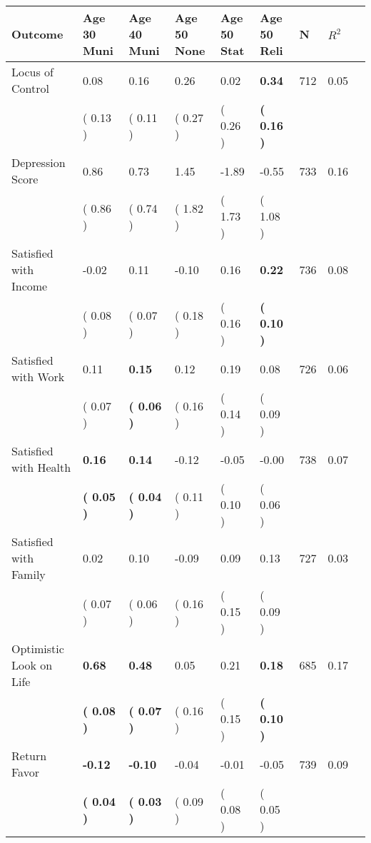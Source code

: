 \begin{tabular}{L{6.2cm} C{1.8cm} C{1.8cm} C{1.8cm} C{1.8cm} C{1.8cm} C{1.8cm} C{0.3cm} C{0.3cm}}
\toprule
 \textbf{Outcome} & \textbf{Age 30 Muni} & \textbf{Age 40 Muni} & \textbf{Age 50 None} & \textbf{Age 50 Stat} & \textbf{Age 50 Reli} & \textbf{N} & \textbf{$ R^2$} \\
\midrule
Locus of Control &      0.08 &      0.16 &      0.26 &      0.02 & \textbf{     0.34}  & 712 &       0.05 \\ 
 & (     0.13 ) & (     0.11 ) & (     0.27 ) & (     0.26 ) & \textbf{(     0.16 )}  & \\
Depression Score &      0.86 &      0.73 &      1.45 &     -1.89 &     -0.55  & 733 &       0.16 \\ 
 & (     0.86 ) & (     0.74 ) & (     1.82 ) & (     1.73 ) & (     1.08 )  & \\
Satisfied with Income &     -0.02 &      0.11 &     -0.10 &      0.16 & \textbf{     0.22}  & 736 &       0.08 \\ 
 & (     0.08 ) & (     0.07 ) & (     0.18 ) & (     0.16 ) & \textbf{(     0.10 )}  & \\
Satisfied with Work &      0.11 & \textbf{     0.15} &      0.12 &      0.19 &      0.08  & 726 &       0.06 \\ 
 & (     0.07 ) & \textbf{(     0.06 )} & (     0.16 ) & (     0.14 ) & (     0.09 )  & \\
Satisfied with Health & \textbf{     0.16} & \textbf{     0.14} &     -0.12 &     -0.05 &     -0.00  & 738 &       0.07 \\ 
 & \textbf{(     0.05 )} & \textbf{(     0.04 )} & (     0.11 ) & (     0.10 ) & (     0.06 )  & \\
Satisfied with Family &      0.02 &      0.10 &     -0.09 &      0.09 &      0.13  & 727 &       0.03 \\ 
 & (     0.07 ) & (     0.06 ) & (     0.16 ) & (     0.15 ) & (     0.09 )  & \\
Optimistic Look on Life & \textbf{     0.68} & \textbf{     0.48} &      0.05 &      0.21 & \textbf{     0.18}  & 685 &       0.17 \\ 
 & \textbf{(     0.08 )} & \textbf{(     0.07 )} & (     0.16 ) & (     0.15 ) & \textbf{(     0.10 )}  & \\
Return Favor & \textbf{    -0.12} & \textbf{    -0.10} &     -0.04 &     -0.01 &     -0.05  & 739 &       0.09 \\ 
 & \textbf{(     0.04 )} & \textbf{(     0.03 )} & (     0.09 ) & (     0.08 ) & (     0.05 )  & \\

\end{tabular}
